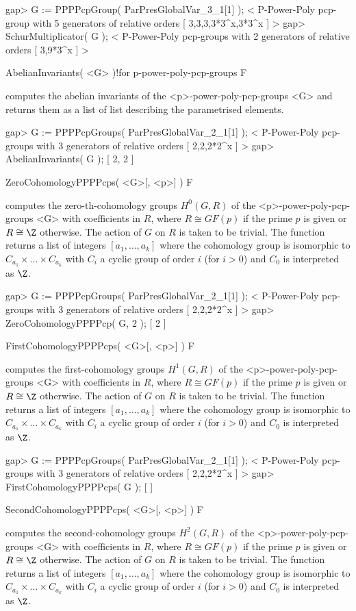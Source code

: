 \beginexample
gap> G := PPPPcpGroup( ParPresGlobalVar_3_1[1] );
< P-Power-Poly pcp-group with 5 generators of relative orders [ 3,3,3,3*3^x,3*3^x ] >
gap> SchurMultiplicator( G );
< P-Power-Poly pcp-groups with 2 generators of relative orders [ 3,9*3^x ] >
\endexample

\>AbelianInvariants( <G> )!{for p-power-poly-pcp-groups} F

computes the abelian invariants of the <p>-power-poly-pcp-groups <G> and returns
them as a list of list describing the parametrised elements.

\beginexample
gap> G := PPPPcpGroups( ParPresGlobalVar_2_1[1] );
< P-Power-Poly pcp-groups with 3 generators of relative orders [ 2,2,2*2^x ] >
gap> AbelianInvariants( G );
[ 2, 2 ]
\endexample

\>ZeroCohomologyPPPPcps( <G>[, <p>] ) F

computes the zero-th-cohomology groups $H^0(G,R)$ of the 
<p>-power-poly-pcp-groups <G> with coefficients in $R$, where $R \cong GF(p)$ if
the prime $p$ is given or $R \cong \Z$ otherwise. The action of $G$ on $R$ is
taken to be trivial. The function returns a list of integers $[a_1,\ldots,
a_k]$ where the cohomology group is isomorphic to $C_{a_1} \times \ldots 
\times C_{a_k}$ with $C_i$ a cyclic group of order $i$ (for $i > 0$) and $C_0$ 
is interpreted as $\Z$.

\beginexample
gap> G := PPPPcpGroups( ParPresGlobalVar_2_1[1] );
< P-Power-Poly pcp-groups with 3 generators of relative orders [ 2,2,2*2^x ] >
gap> ZeroCohomologyPPPPcp( G, 2 );
[ 2 ]
\endexample

\>FirstCohomologyPPPPcps( <G>[, <p>] ) F

computes the first-cohomology groups $H^1(G,R)$ of the 
<p>-power-poly-pcp-groups <G> with coefficients in $R$, where $R \cong GF(p)$ if
the prime $p$ is given or $R \cong \Z$ otherwise. The action of $G$ on $R$ is
taken to be trivial. The function returns a list of integers $[a_1,\ldots,
a_k]$ where the cohomology group is isomorphic to $C_{a_1} \times \ldots 
\times C_{a_k}$ with $C_i$ a cyclic group of order $i$ (for $i > 0$) and $C_0$ 
is interpreted as $\Z$.

\beginexample
gap> G := PPPPcpGroups( ParPresGlobalVar_2_1[1] );
< P-Power-Poly pcp-groups with 3 generators of relative orders [ 2,2,2*2^x ] >
gap> FirstCohomologyPPPPcps( G );
[  ]
\endexample

\>SecondCohomologyPPPPcps( <G>[, <p>] ) F

computes the second-cohomology groups $H^2(G,R)$ of the 
<p>-power-poly-pcp-groups <G> with coefficients in $R$, where $R \cong GF(p)$ if
the prime $p$ is given or $R \cong \Z$ otherwise. The action of $G$ on $R$ is
taken to be trivial. The function returns a list of integers $[a_1,\ldots,
a_k]$ where the cohomology group is isomorphic to $C_{a_1} \times \ldots 
\times C_{a_k}$ with $C_i$ a cyclic group of order $i$ (for $i > 0$) and $C_0$ 
is interpreted as $\Z$.

